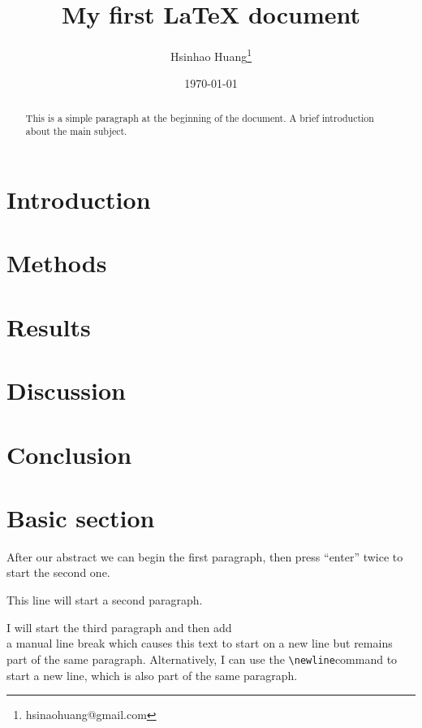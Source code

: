 \documentclass[12pt, a4paper]{article} %
\title{My first LaTeX document}                            %
\author{Hsinhao Huang\thanks{hsinaohuang@gmail.com}}       %
\date{\today}                                              %
\begin{document}

    \maketitle

    \tableofcontents

    \begin{abstract}
        This is a simple paragraph at the beginning of the
        document. A brief introduction about the main subject.
    \end{abstract}

    \section{Introduction}\label{sec:intro}
    \section{Methods}     \label{sec:metho}
    \section{Results}     \label{sec:resul}
    \section{Discussion}  \label{sec:discu}
    \section{Conclusion}  \label{sec:concl}

    \appendix

    \section{Basic section}
        After our abstract we can begin the first paragraph, then press ``enter'' twice to start the second one.

        This line will start a second paragraph.

        I will start the third paragraph and then add \\ a manual line break which causes
        this text to start on a new line but remains part of the same paragraph.
        Alternatively, I can use the \verb|\newline|\newline command to start a new line,
        which is also part of the same paragraph.
\end{document}
